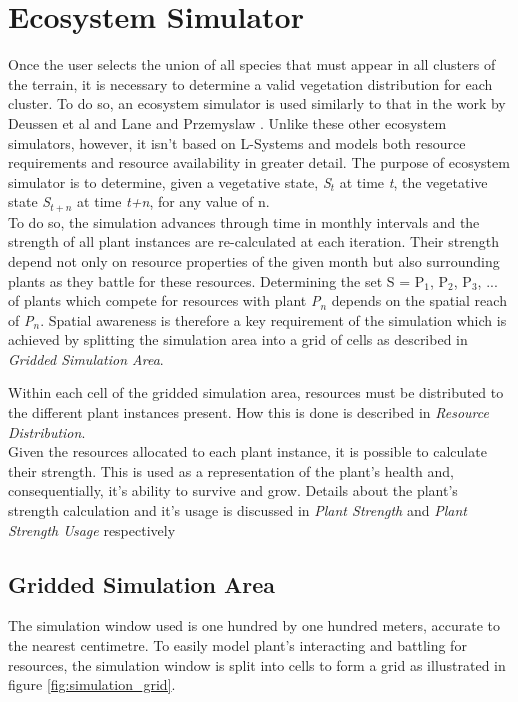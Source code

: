 \section{Ecosystem Simulator}

Once the user selects the union of all species that must appear in all clusters of the terrain, it is necessary to determine a valid vegetation distribution for each cluster. To do so, an ecosystem simulator is used similarly to that in the work by Deussen et al \cite{Deussen1998} and Lane and Przemyslaw \cite{Lane2002}. Unlike these other ecosystem simulators, however, it isn't based on L-Systems and models both resource requirements and resource availability in greater detail. The purpose of ecosystem simulator is to determine, given a vegetative state, \textit{S$_{t}$} at time \textit{t}, the vegetative state \textit{S$_{t+n}$} at time \textit{t+n}, for any value of n.  \\

To do so, the simulation advances through time in monthly intervals and the strength of all plant instances are re-calculated at each iteration. Their strength depend not only on resource properties of the given month but also surrounding plants as they battle for these resources. Determining the set S = {P$_{1}$, P$_{2}$, P$_{3}$, ...} of plants which compete for resources with plant \textit{P$_{n}$} depends on the spatial reach of \textit{P$_{n}$}. Spatial awareness is therefore a key requirement of the simulation which is achieved by splitting the simulation area into a grid of cells as described in \textit{Gridded Simulation Area}.

Within each cell of the gridded simulation area, resources must be distributed to the different plant instances present. How this is done is described in \textit{Resource Distribution}. \\

Given the resources allocated to each plant instance, it is possible to calculate their strength. This is used as a representation of the plant's health and, consequentially, it's ability to survive and grow. Details about the plant's strength calculation and it's usage is discussed in \textit{Plant Strength} and \textit{Plant Strength Usage} respectively

\subsection{Gridded Simulation Area}

The simulation window used is one hundred by one hundred meters, accurate to the nearest centimetre. To easily model plant's interacting and battling for resources, the simulation window is split into cells to form a grid as illustrated in figure \ref{fig:simulation_grid}. 

